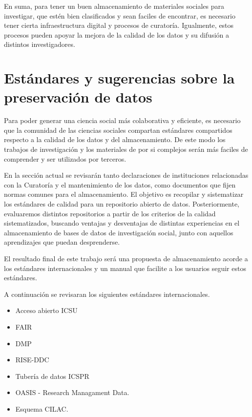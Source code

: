 \documentclass[
  14pt,
]{book}
\begin{document}
En suma, para tener un buen almacenamiento de materiales sociales para investigar, que estén bien clasificados y sean faciles de encontrar, es necesario tener cierta infraestructura digital y procesos de curatoría. Igualmente, estos procesos pueden apoyar la mejora de la calidad de los datos y su difusión a distintos investigadores.

\hypertarget{estuxe1ndares-y-sugerencias-sobre-la-preservaciuxf3n-de-datos}{%
\chapter{Estándares y sugerencias sobre la preservación de datos}\label{estuxe1ndares-y-sugerencias-sobre-la-preservaciuxf3n-de-datos}}

Para poder generar una ciencia social más colaborativa y eficiente, es necesario que la comunidad de las ciencias sociales compartan estándares compartidos respecto a la calidad de los datos y del almacenamiento. De este modo los trabajos de investigación y los materiales de por si complejos serán más faciles de comprender y ser utilizados por terceros.

En la sección actual se revisarán tanto declaraciones de instituciones relacionadas con la Curatoría y el mantenimiento de los datos, como documentos que fijen normas comunes para el almacenamiento. El objetivo es recopilar y sistematizar los estándares de calidad para un repositorio abierto de datos. Posteriormente, evaluaremos distintos repositorios a partir de los criterios de la calidad sistematizados, buscando ventajas y desventajas de distintas experiencias en el almacenamiento de bases de datos de investigación social, junto con aquellos aprendizajes que puedan desprenderse.

El resultado final de este trabajo será una propuesta de almacenamiento acorde a los estándares internacionales y un manual que facilite a los usuarios seguir estos estándares.

A continuación se revisaran los siguientes estándares internacionales.

\begin{itemize}
\item
  Acceso abierto ICSU
\item
  FAIR
\item
  DMP
\item
  RISE-DDC
\item
  Tubería de datos ICSPR
\item
  OASIS - Research Managament Data.
\item
  Esquema CILAC.
\end{itemize}
\end{document}

